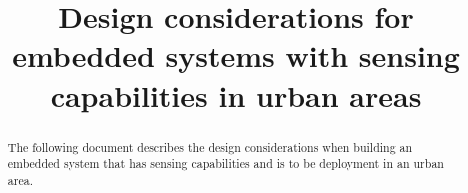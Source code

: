\documentclass[a4paper,10pt]{article}
\title{Design considerations for embedded systems with sensing capabilities in urban areas}
\author{}
\begin{document}
\maketitle

\begin{abstract}
 The following document describes the design considerations when building an embedded system that has sensing capabilities and is to be deployment in an urban area.
\end{abstract}

\newpage

\tableofcontents

\newpage










{}

\end{document}

